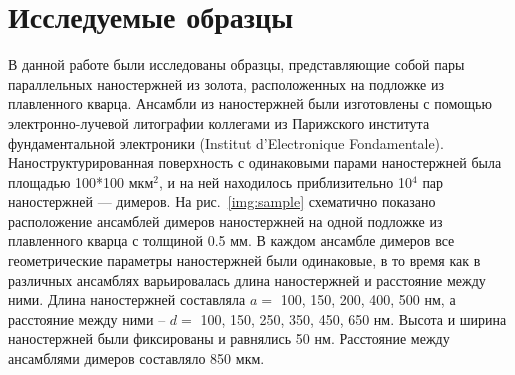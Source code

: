 \section{Исследуемые образцы}

В данной работе были исследованы образцы, представляющие собой пары параллельных наностержней из золота, расположенных на подложке из плавленного кварца. Ансамбли из наностержней были изготовлены с помощью  электронно-лучевой литографии коллегами из Парижского института фундаментальной электроники (Institut d'Electronique Fondamentale). Наноструктурированная поверхность с одинаковыми парами наностержней была площадью 100*100 мкм$ ^2 $, и на ней находилось приблизительно 10$ ^4 $ пар наностержней --- димеров.
На рис.~\ref{img:sample} схематично показано расположение ансамблей димеров наностержней на одной подложке из плавленного кварца с толщиной 0.5 мм. В каждом ансамбле димеров все геометрические параметры наностержней были одинаковые, в то время как в различных ансамблях варьировалась длина наностержней и расстояние между ними. Длина наностержней составляла $ a = $ 100, 150, 200, 400, 500 нм, а расстояние между ними -- $ d = $ 100, 150, 250, 350, 450, 650 нм. Высота и ширина наностержней были фиксированы и равнялись 50 нм. Расстояние между ансамблями димеров составляло 850 мкм.

